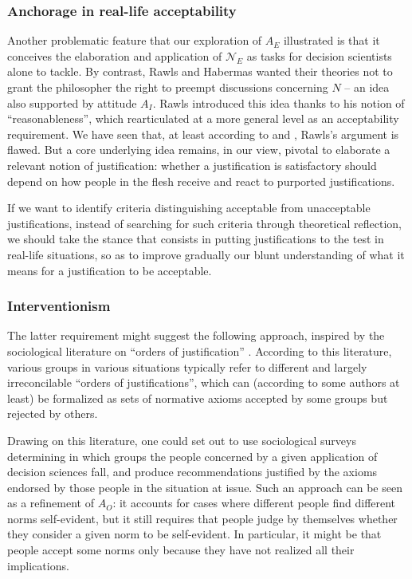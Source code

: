 \documentclass[preprint, french, english, 11pt, authoryear]{elsarticle}%
\begin{document}
\subsubsection{Anchorage in real-life acceptability}
Another problematic feature that our exploration of $A_E$ illustrated is that it conceives the elaboration and application of $\mathscr{N}_E$ as tasks for decision scientists alone to tackle. 
By contrast, Rawls and Habermas wanted their theories not to grant the philosopher the right to preempt discussions concerning $N$ -- an idea also supported by attitude $A_I$. 
Rawls introduced this idea thanks to his notion of ``reasonableness'', which \citeauthor{estlund_democratic_2009} rearticulated at a more general level as an acceptability requirement. 
We have seen that, at least according to \citeauthor{habermas_reconciliation_1995} and \citeauthor{estlund_democratic_2009}, Rawls's argument is flawed. 
But a core underlying idea remains, in our view, pivotal to elaborate a relevant notion of justification: whether a justification is satisfactory should depend on how people in the flesh receive and react to purported justifications.
\begin{changebar}
If we want to identify criteria distinguishing acceptable from unacceptable justifications, instead of searching for such criteria through theoretical reflection, we should take the stance that consists in putting justifications to the test in real-life situations, 
so as to improve gradually our blunt understanding of what it means for a justification to be acceptable.
\end{changebar}

\subsubsection{Interventionism}
The latter requirement might suggest the following approach, inspired by the sociological literature on “orders of justification” \citep{boltanski_justification_2006}. 
According to this literature, various groups in various situations typically refer to different and largely irreconcilable “orders of justifications”, which can (according to some authors at least) be formalized as sets of normative axioms accepted by some groups but rejected by others.

Drawing on this literature, one could set out to use sociological surveys determining in which groups the people concerned by a given application of decision sciences fall, and produce recommendations justified by the axioms endorsed by those people in the situation at issue. 
Such an approach can be seen as a refinement of $A_O$: it accounts for cases where different people find different norms self-evident, but it still requires that people judge by themselves whether they consider a given norm to be self-evident. 
In particular, it might be that people accept some norms only because they have not realized all their implications.
\end{document}
